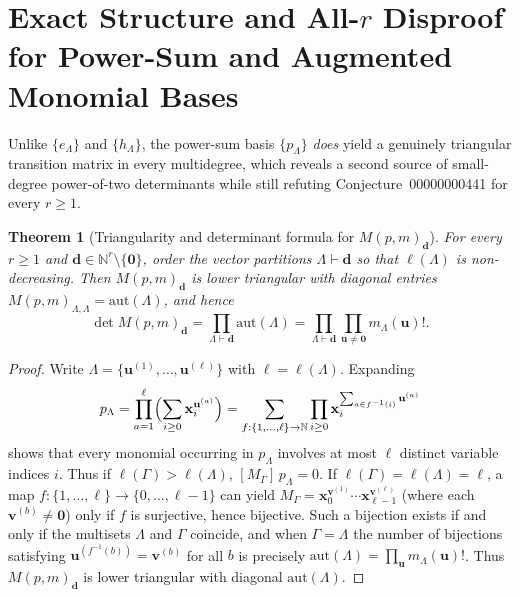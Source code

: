 \documentclass[11pt,a4paper]{article}
\newtheorem{theorem}{Theorem}[section]
\theoremstyle{definition}
\theoremstyle{remark}
\newcommand{\NN}{\mathbb{N}}
\newcommand{\aut}{\mathrm{aut}}
\newcommand{\vecd}{\mathbf{d}}
\newcommand{\vecu}{\mathbf{u}}
\newcommand{\vecv}{\mathbf{v}}
\newcommand{\vecx}{\mathbf{x}}
\begin{document}
\section{Exact Structure and All-\texorpdfstring{$r$}{r} Disproof for Power-Sum and Augmented Monomial Bases}

Unlike $\{e_\Lambda\}$ and $\{h_\Lambda\}$, the power-sum basis $\{p_\Lambda\}$ \emph{does} yield a genuinely triangular transition matrix in every multidegree, which reveals a second source of small-degree power-of-two determinants while still refuting Conjecture~00000000441 for every $r \ge 1$.

\begin{theorem}[Triangularity and determinant formula for $M(p,m)_{\vecd}$]\label{thm:powersum}
For every $r \ge 1$ and $\vecd \in \NN^r \setminus \{\mathbf{0}\}$, order the vector partitions $\Lambda \vdash \vecd$ so that $\ell(\Lambda)$ is non-decreasing. Then $M(p,m)_{\vecd}$ is lower triangular with diagonal entries $M(p,m)_{\Lambda,\Lambda} = \aut(\Lambda)$, and hence
\[
  \det M(p,m)_{\vecd} = \prod_{\Lambda \vdash \vecd} \aut(\Lambda) = \prod_{\Lambda \vdash \vecd} \prod_{\vecu \neq \mathbf{0}} m_\Lambda(\vecu)!.
\]
\end{theorem}

\begin{proof}
Write $\Lambda = \{\vecu^{(1)}, \dots, \vecu^{(\ell)}\}$ with $\ell = \ell(\Lambda)$. Expanding
\[
  p_\Lambda = \prod_{a=1}^\ell \Bigl(\sum_{i \ge 0} \vecx_i^{\vecu^{(a)}}\Bigr) = \sum_{f : \{1,\dots,\ell\} \to \NN} \prod_{i \ge 0} \vecx_i^{\sum_{a \in f^{-1}(i)} \vecu^{(a)}}
\]
shows that every monomial occurring in $p_\Lambda$ involves at most $\ell$ distinct variable indices $i$. Thus if $\ell(\Gamma) > \ell(\Lambda)$, $[M_\Gamma]\, p_\Lambda = 0$. If $\ell(\Gamma) = \ell(\Lambda) = \ell$, a map $f : \{1,\dots,\ell\} \to \{0,\dots,\ell-1\}$ can yield $M_\Gamma = \vecx_0^{\vecv^{(1)}}\cdots \vecx_{\ell-1}^{\vecv^{(\ell)}}$ (where each $\vecv^{(b)} \neq \mathbf{0}$) only if $f$ is surjective, hence bijective. Such a bijection exists if and only if the multisets $\Lambda$ and $\Gamma$ coincide, and when $\Gamma = \Lambda$ the number of bijections satisfying $\vecu^{(f^{-1}(b))} = \vecv^{(b)}$ for all $b$ is precisely $\aut(\Lambda) = \prod_{\vecu} m_\Lambda(\vecu)!$. Thus $M(p,m)_{\vecd}$ is lower triangular with diagonal $\aut(\Lambda)$.
\end{proof}
\end{document}
